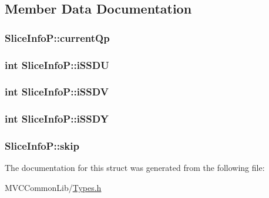 \subsection{Member Data Documentation}
\hypertarget{struct_slice_info_p_a74257bd8b090949d86ec7350bea2c51f}{
\subsubsection[{currentQp}]{ {\bf SliceInfoP::currentQp}}}
\label{struct_slice_info_p_a74257bd8b090949d86ec7350bea2c51f}
\hypertarget{struct_slice_info_p_a3024a9e52aa66fdddf6055f79198c579}{
\subsubsection[{iSSDU}]{\setlength{\rightskip}{0pt plus 5cm}int {\bf SliceInfoP::iSSDU}}}
\label{struct_slice_info_p_a3024a9e52aa66fdddf6055f79198c579}
\hypertarget{struct_slice_info_p_a5f3b5a8d778530e3b803b91129bd63df}{
\subsubsection[{iSSDV}]{\setlength{\rightskip}{0pt plus 5cm}int {\bf SliceInfoP::iSSDV}}}
\label{struct_slice_info_p_a5f3b5a8d778530e3b803b91129bd63df}
\hypertarget{struct_slice_info_p_a3a19f5c6611da92995cc2bc2a8383995}{
\subsubsection[{iSSDY}]{\setlength{\rightskip}{0pt plus 5cm}int {\bf SliceInfoP::iSSDY}}}
\label{struct_slice_info_p_a3a19f5c6611da92995cc2bc2a8383995}
\hypertarget{struct_slice_info_p_a6b647c1903a7cb53b2b4584f62976b90}{
\subsubsection[{skip}]{ {\bf SliceInfoP::skip}}}
\label{struct_slice_info_p_a6b647c1903a7cb53b2b4584f62976b90}


The documentation for this struct was generated from the following file:\begin{DoxyCompactItemize}
\item 
MVCCommonLib/\hyperlink{_types_8h}{Types.h}\end{DoxyCompactItemize}
